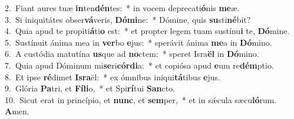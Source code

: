{2.~}Fiant aures tuæ \textbf{in}ten\textbf{dén}tes:~* in vocem deprecati\textbf{ó}nis \textbf{me}æ.\\
{3.~}Si iniquitátes obser\textbf{vá}veris, \textbf{Dó}\textbf{mi}ne:~* Dómine, quis \textbf{su}sti\textbf{né}bit?\\
{4.~}Quia apud te propiti\textbf{á}ti\textbf{o} est:~* et propter legem tuam sustínu\textbf{i} te, \textbf{Dó}mine.\\
{5.~}Sustínuit ánima mea in \textbf{ver}bo \textbf{e}jus:~* sperávit ánima \textbf{me}a in \textbf{Dó}mino.\\
{6.~}A custódia matutína \textbf{us}que ad \textbf{no}ctem:~* speret Isra\textbf{ël} in \textbf{Dó}mino.\\
{7.~}Quia apud Dóminum mi\textbf{se}ri\textbf{cór}\textbf{di}a:~* et copiósa apud \textbf{e}um re\textbf{dém}ptio.\\
{8.~}Et ipse \textbf{ré}dimet \textbf{Is}\textbf{ra}ël:~* ex ómnibus iniqui\textbf{tá}tibus \textbf{e}jus.\\
{9.~}Glória \textbf{Pa}tri, et \textbf{Fí}\textbf{li}o,~* et Spi\textbf{rí}tui \textbf{San}cto.\\
{10.~}Sicut erat in princípio, et \textbf{nunc}, et \textbf{sem}per,~* et in sǽcula sæcu\textbf{ló}rum. \textbf{A}men.\\
